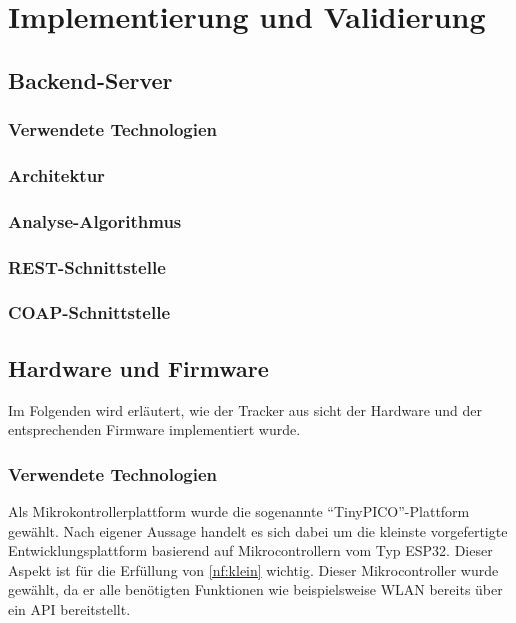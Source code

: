 \chapter{Implementierung und Validierung}

\section{Backend-Server}

\subsection{Verwendete Technologien}

\subsection{Architektur}

\subsection{Analyse-Algorithmus}

\subsection{REST-Schnittstelle}

\subsection{COAP-Schnittstelle}


\section{Hardware und Firmware}

Im Folgenden wird erläutert, wie der Tracker aus sicht der Hardware und der entsprechenden Firmware
implementiert wurde.

\subsection{Verwendete Technologien}

Als Mikrokontrollerplattform wurde die sogenannte \enquote{TinyPICO}-Plattform gewählt. Nach eigener
Aussage handelt es sich dabei um die kleinste vorgefertigte Entwicklungsplattform basierend auf
Mikrocontrollern vom Typ ESP32. Dieser Aspekt ist für die Erfüllung von \ref*{nf:klein} wichtig.
Dieser Mikrocontroller wurde gewählt, da er alle benötigten Funktionen wie beispielsweise \gls{WLAN}
bereits über ein \gls{API} bereitstellt.

